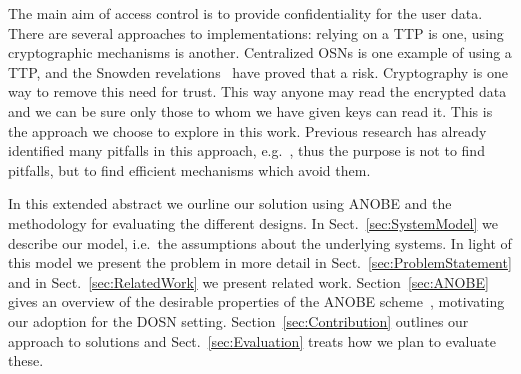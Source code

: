 The main aim of access control is to provide confidentiality for the user 
data.
There are several approaches to implementations: relying on a \ac{TTP} is one, 
using cryptographic mechanisms is another.
Centralized \acp{OSN} is one example of using a \ac{TTP}, and the Snowden 
revelations~\cite{prism} have proved that a risk.
Cryptography is one way to remove this need for trust.
This way anyone may read the encrypted data and we can be sure only those to 
whom we have given keys can read it.
This is the approach we choose to explore in this work.
Previous research has already identified many pitfalls in this approach, 
e.g.~\cite{metadata}, thus the purpose is not to find pitfalls, but to find 
efficient mechanisms which avoid them.

In this extended abstract we ourline our solution using \ac{ANOBE} and the 
methodology for evaluating the different designs.
In Sect.~\ref{sec:SystemModel} we describe our model, i.e.~the assumptions 
about the underlying systems.
In light of this model we present the problem in more detail in 
Sect.~\ref{sec:ProblemStatement} and in Sect.~\ref{sec:RelatedWork} we present 
related work.
Section~\ref{sec:ANOBE} gives an overview of the desirable properties of the 
\ac{ANOBE} scheme~\cite{anobe}, motivating our adoption for the \ac{DOSN} 
setting.
Section~\ref{sec:Contribution} outlines our approach to solutions and 
Sect.~\ref{sec:Evaluation} treats how we plan to evaluate these.



